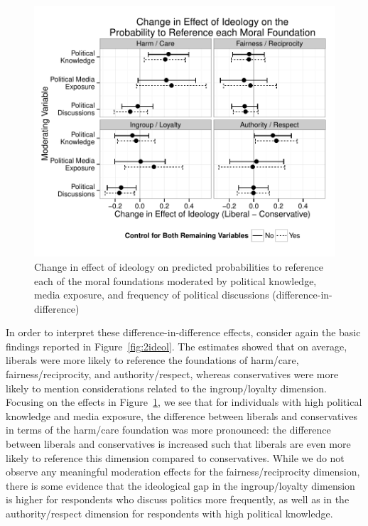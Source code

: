\documentclass[12pt]{article}
\begin{document}
\begin{figure}[h]\centering
\includegraphics[scale=.9]{../calc/fig/fig4ideolearn.pdf}
\caption{Change in effect of ideology on predicted probabilities to reference each of the moral foundations moderated by political knowledge, media exposure, and frequency of political discussions (difference-in-difference)}\label{fig:4ideolearn}
\end{figure}

In order to interpret these difference-in-difference effects, consider again the basic findings reported in Figure~\ref{fig:2ideol}. The estimates showed that on average, liberals were more likely to reference the foundations of harm/care, fairness/reciprocity, and authority/respect, whereas conservatives were more likely to mention considerations related to the ingroup/loyalty dimension. Focusing on the effects in Figure~\ref{fig:4ideolearn}, we see that for individuals with high political knowledge and media exposure, the difference between liberals and conservatives in terms of the harm/care foundation was more pronounced: the difference between liberals and conservatives is increased such that liberals are even more likely to reference this dimension compared to conservatives. While we do not observe any meaningful moderation effects for the fairness/reciprocity dimension, there is some evidence that the ideological gap in the ingroup/loyalty dimension is higher for respondents who discuss politics more frequently, as well as in the authority/respect dimension for respondents with high political knowledge.
\end{document}
